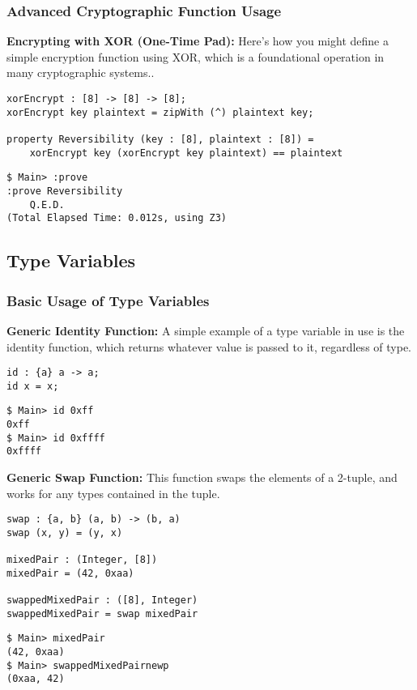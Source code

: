 \newpage
\subsubsection{Advanced Cryptographic Function Usage}
\textbf{Encrypting with XOR (One-Time Pad):} Here’s how you might define a simple encryption function using XOR, which is a foundational operation in many cryptographic systems..
\begin{lstlisting}[style=cryptol]
xorEncrypt : [8] -> [8] -> [8];
xorEncrypt key plaintext = zipWith (^) plaintext key;

property Reversibility (key : [8], plaintext : [8]) = 
	xorEncrypt key (xorEncrypt key plaintext) == plaintext
\end{lstlisting}
\begin{lstlisting}[style=zsh]
$ Main> :prove
:prove Reversibility
	Q.E.D.
(Total Elapsed Time: 0.012s, using Z3)
\end{lstlisting}

\subsection{Type Variables}

\subsubsection{Basic Usage of Type Variables}
\textbf{Generic Identity Function:} A simple example of a type variable in use is the identity function, which returns whatever value is passed to it, regardless of type.
\begin{lstlisting}[style=cryptol]
id : {a} a -> a;
id x = x;
\end{lstlisting}
\begin{lstlisting}[style=zsh]
$ Main> id 0xff
0xff
$ Main> id 0xffff
0xffff
\end{lstlisting}
\vspace{16pt}
\textbf{Generic Swap Function:} This function swaps the elements of a 2-tuple, and works for any types contained in the tuple.
\begin{lstlisting}[style=cryptol]
swap : {a, b} (a, b) -> (b, a)
swap (x, y) = (y, x)

mixedPair : (Integer, [8])
mixedPair = (42, 0xaa)

swappedMixedPair : ([8], Integer)
swappedMixedPair = swap mixedPair
\end{lstlisting}
\begin{lstlisting}[style=zsh]
$ Main> mixedPair
(42, 0xaa)
$ Main> swappedMixedPairnewp
(0xaa, 42)
\end{lstlisting}

